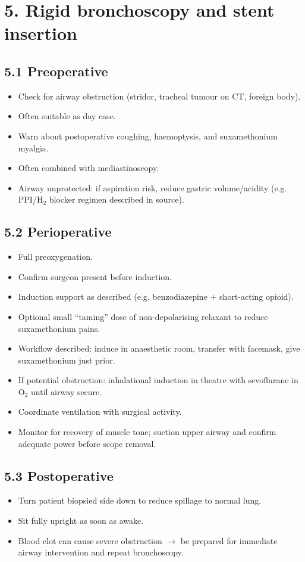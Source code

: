 \documentclass[11pt,a4paper]{article}
\begin{document}
\section{5. Rigid bronchoscopy and stent insertion}

\subsection{5.1 Preoperative}
\begin{itemize}[leftmargin=*, itemsep=2pt]
  \item Check for airway obstruction (stridor, tracheal tumour on CT, foreign body).
  \item Often suitable as day case.
  \item Warn about postoperative coughing, haemoptysis, and suxamethonium myalgia.
  \item Often combined with mediastinoscopy.
  \item Airway unprotected: if aspiration risk, reduce gastric volume/acidity (e.g. PPI/H\(_2\) blocker regimen described in source).
\end{itemize}

\subsection{5.2 Perioperative}
\begin{itemize}[leftmargin=*, itemsep=2pt]
  \item Full preoxygenation.
  \item Confirm surgeon present before induction.
  \item Induction support as described (e.g. benzodiazepine + short-acting opioid).
  \item Optional small ``taming'' dose of non-depolarising relaxant to reduce suxamethonium pains.
  \item Workflow described: induce in anaesthetic room, transfer with facemask, give suxamethonium just prior.
  \item If potential obstruction: inhalational induction in theatre with sevoflurane in \(\mathrm{O_2}\) until airway secure.
  \item Coordinate ventilation with surgical activity.
  \item Monitor for recovery of muscle tone; suction upper airway and confirm adequate power before scope removal.
\end{itemize}

\subsection{5.3 Postoperative}
\begin{itemize}[leftmargin=*, itemsep=2pt]
  \item Turn patient biopsied side down to reduce spillage to normal lung.
  \item Sit fully upright as soon as awake.
  \item Blood clot can cause severe obstruction \(\rightarrow\) be prepared for immediate airway intervention and repeat bronchoscopy.
\end{itemize}
\end{document}
